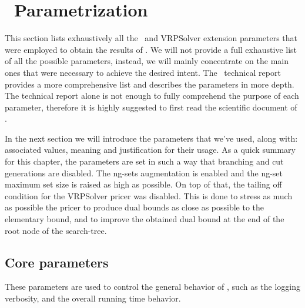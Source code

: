 \chapter{\bapcod\ Parametrization}
\label{sec:bapcod-appendix}

This section lists exhaustively all the \bapcod\ and VRPSolver extension
parameters that were employed  to obtain the results of .
We will not provide a full exhaustive list of all the possible parameters,
instead, we will mainly concentrate on the main ones that were necessary to achieve
the desired intent.
The \bapcod\ technical report \textcite{sadykov2021} provides a more
comprehensive list and describes the parameters in more depth.
The technical report alone is not enough to fully comprehend the purpose of each parameter,
therefore it is highly suggested to first read the scientific document of \textcite{pessoa2020a}.

\medskip

In the next section we will introduce the parameters that we've used, along
with: associated values, meaning and justification for their usage.
As a quick summary for this chapter, the parameters are set in such a way
that branching and cut generations are disabled.
The ng-sets augmentation is enabled and the ng-set maximum
set size is raised as high as possible.
On top of that, the tailing off condition for the VRPSolver pricer was disabled.
This is done to stress as much as possible the pricer to produce
dual bounds as close as possible to the elementary bound, and to
improve the obtained dual bound at the end of the root node of the search-tree.

\section{Core parameters}

These parameters are used to control the general behavior of \bapcod,
such as the logging verbosity, and the overall running time behavior.

